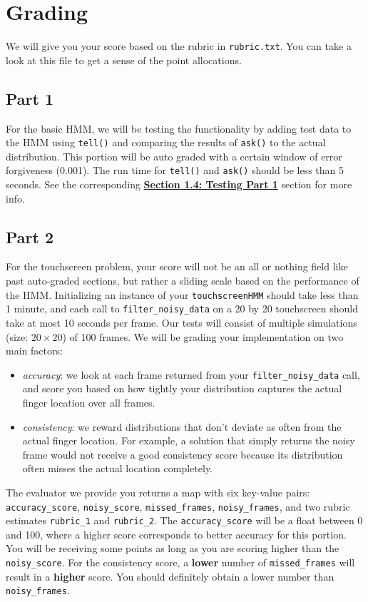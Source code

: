 \documentclass{article}
\begin{document}
\section{Grading}
We will give you your score based on the rubric in \texttt{rubric.txt}. You can take a look at this file to get a sense of the point allocations.

\subsection{Part 1}
For the basic HMM, we will be testing the functionality by adding test data to the HMM using \texttt{tell()} and comparing the results of \texttt{ask()} to the actual distribution. This portion will be auto graded with a certain window of error forgiveness (0.001). The run time for \texttt{tell()} and \texttt{ask()} should be less than 5 seconds. See the corresponding \hyperref[subsec:testingpart1]{\textbf{Section 1.4: Testing Part 1}} section for more info.

\subsection{Part 2}
\label{subsec:part2grading}
For the touchscreen problem, your score will not be an all or nothing field like past auto-graded sections, but rather a sliding scale based on the performance of the HMM. Initializing an instance of your \texttt{touchscreenHMM} should take less than 1 minute, and each call to \texttt{filter\_noisy\_data} on a 20 by 20 touchscreen should take at most 10 seconds per frame. Our tests will consist of multiple simulations (size: $20 \times 20$) of 100 frames. We will be grading your implementation on two main factors:
\begin{itemize}
    \item \textit{accuracy}: we look at each frame returned from your \texttt{filter\_noisy\_data} call, and score you based on how tightly your distribution captures the actual finger location over all frames.
    \item \textit{consistency}: we reward distributions that don't deviate as often from the actual finger location. For example, a solution that simply returns the noisy frame would not receive a good consistency score because its distribution often misses the actual location completely.
\end{itemize}
The evaluator we provide you returns a map with six key-value pairs: \texttt{accuracy\_score}, \texttt{noisy\_score}, \texttt{missed\_frames}, \texttt{noisy\_frames}, and two rubric estimates \texttt{rubric\_1} and \texttt{rubric\_2}. The \texttt{accuracy\_score} will be a float between 0 and 100, where a higher score corresponds to better accuracy for this portion. You will be receiving some points as long as you are scoring higher than the \texttt{noisy\_score}. For the consistency score, a \textbf{lower} number of \texttt{missed\_frames} will result in a \textbf{higher} score. You should definitely obtain a lower number than \texttt{noisy\_frames}.
\end{document}
